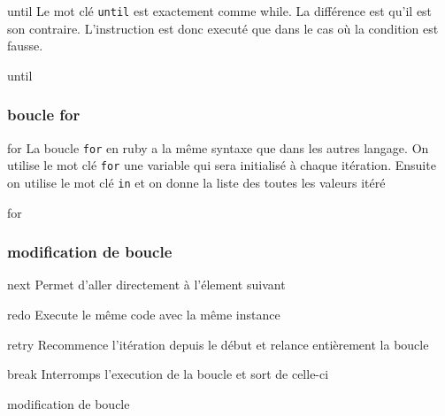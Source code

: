 \documentclass{beamer}
\begin{document}
\begin{frame}
  \begin{block}{until}
    Le mot cl\'e \verb?until? est exactement comme while. La diff\'erence est qu'il est son contraire. L'instruction est donc execut\'e que dans le cas où la condition est fausse.
  \end{block}
\end{frame}

\begin{frame}
  \begin{block}{until}
    
  \end{block}
\end{frame}

\begin{frame}
  \frametitle{boucle for}
  \begin{block}{for}
    La boucle \verb?for? en ruby a la même syntaxe que dans les autres langage.
    On utilise le mot cl\'e \verb?for? une variable qui sera initialis\'e à
    chaque it\'eration. Ensuite on utilise le mot cl\'e \verb?in? et on donne
    la liste des toutes les valeurs it\'er\'e
  \end{block}
\end{frame}

\begin{frame}
  \begin{block}{for}
    
  \end{block}
\end{frame}

\begin{frame}
  \frametitle{modification de boucle}
  \begin{block}{next}
    Permet d'aller directement à l'\'element suivant
  \end{block}
  \begin{block}{redo}
    Execute le même code avec la même instance
  \end{block}
  \begin{block}{retry}
    Recommence l'it\'eration depuis le d\'ebut et relance entièrement la boucle
  \end{block}
  \begin{block}{break}
    Interromps l'execution de la boucle et sort de celle-ci
  \end{block}
\end{frame}

\begin{frame}
  \begin{block}{modification de boucle}
    
  \end{block}
\end{frame}
\end{document}
